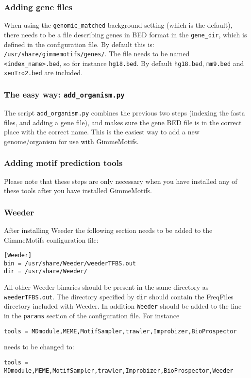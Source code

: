 \documentclass[11pt]{article}
\begin{document}
\subsubsection{Adding gene files}
When using the \texttt{genomic\_matched} background setting (which is the default), there needs to be a file describing genes in BED format in the \texttt{gene\_dir}, which is defined in the configuration file. By default this is: \texttt{/usr/share/gimmemotifs/genes/}. The file needs to be named \texttt{<index\_name>.bed}, so for instance \texttt{hg18.bed}. By default \texttt{hg18.bed}, \texttt{mm9.bed} and \texttt{xenTro2.bed} are included.

\subsubsection{The easy way: \texttt{add\_organism.py}}
The script \texttt{add\_organism.py} combines the previous two steps (indexing the fasta files, and adding a gene file), and makes sure the gene BED file is in the correct place with the correct name. This is the easiest way to add a new genome/organism for use with GimmeMotifs.

\subsubsection{Adding motif prediction tools} \label{sec:adding_tools}
Please note that these steps are only necessary when you have installed any of these tools after you have installed GimmeMotifs.

\subsubsection*{Weeder}
After installing Weeder the following section needs to be added to the GimmeMotifs configuration file:
\begin{verbatim}
[Weeder]
bin = /usr/share/Weeder/weederTFBS.out
dir = /usr/share/Weeder/ 
\end{verbatim}
All other Weeder binaries should be present in the same directory as \texttt{weederTFBS.out}. The directory specified by \texttt{dir} should contain the FreqFiles directory included with Weeder.
In addition \texttt{Weeder} should be added to the line in the \texttt{params} section of the configuration file. For instance 
\begin{verbatim}
tools = MDmodule,MEME,MotifSampler,trawler,Improbizer,BioProspector
\end{verbatim}
needs to be changed to:
\begin{verbatim}
tools = MDmodule,MEME,MotifSampler,trawler,Improbizer,BioProspector,Weeder
\end{verbatim}
\end{document}
